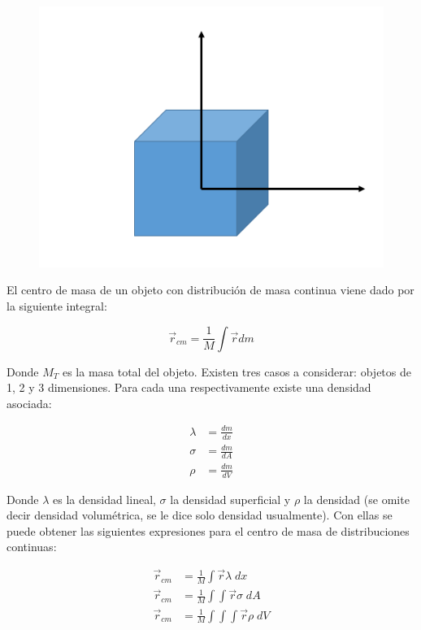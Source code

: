 \documentclass[a4paper,11pt]{article}
\begin{document}
\begin{figure}
	\includegraphics[scale=0.5]{./im/3d}
\end{figure}


El centro de masa de un objeto con distribución de masa continua viene dado por la siguiente integral:

\begin{equation}
 \vec{r}_{cm} = \frac{1}{M} \int \vec{r} dm
\end{equation}

Donde $M_T$ es la masa total del objeto. Existen tres casos a considerar: objetos de 1, 2 y 3 dimensiones. Para cada una respectivamente existe una densidad asociada:

\begin{subequations}
	\begin{align}
	\lambda &= \frac{d m}{dx} \\
	\sigma &= \frac{d m}{dA} \\
	\rho &= \frac{d m}{dV} 
	\end{align}
\end{subequations}

Donde $\lambda$ es la densidad lineal, $\sigma$ la densidad superficial y $\rho$ la densidad (se omite decir densidad volumétrica, se le dice solo densidad usualmente). Con ellas se puede obtener las siguientes expresiones para el centro de masa de distribuciones continuas:

\begin{subequations}
	\begin{align}
	\vec{r}_{cm} &= \frac{1}{M} \int \vec{r} \lambda \;dx  \\
	\vec{r}_{cm} &= \frac{1}{M} \int \int \vec{r} \sigma \;dA \\
	\vec{r}_{cm} &= \frac{1}{M} \int \int \int \vec{r} \rho\; dV 
	\end{align}
\end{subequations}
\end{document}
